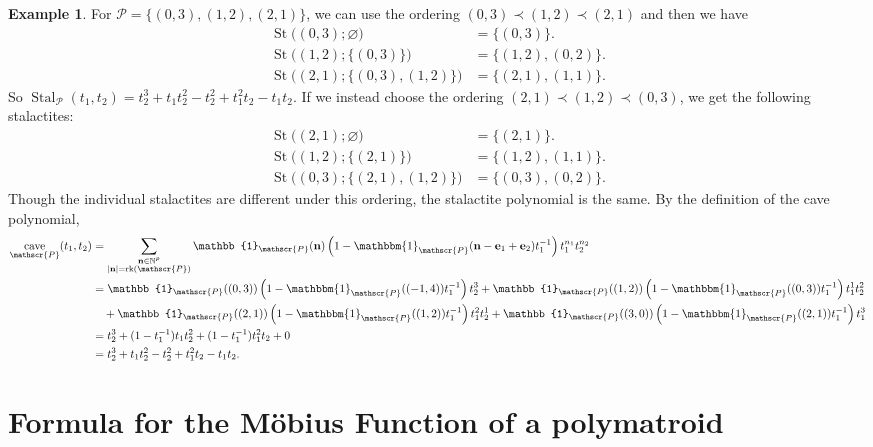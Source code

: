 \documentclass[a4paper, 11pt]{amsart}
\theoremstyle{definition}
\newtheorem{example}[example]{Example}
\newcommand{\bfn}{\mathbf{n}}
\newcommand{\bfe}{\mathbf{e}}
\newcommand{\sP}{\mathscr{P}}
\newcommand{\N}{\mathbb{N}}
\DeclareMathOperator{\rk}{rk}
\DeclareMathOperator{\St}{St}
\DeclareMathOperator{\cave}{cave}
\DeclareMathOperator{\Stal}{Stal}
\begin{document}
\begin{example}\label{ex:stal}
    For $\sP = \big\{(0,3), (1,2), (2,1)\big\}$, we can use the ordering $(0,3) \prec (1,2) \prec (2,1)$ and then we have 
    \begin{align*}
        \St\big((0,3);\varnothing\big) &= \{(0,3)\}.\\
        \St\big((1,2);\{(0,3)\}\big) &= \{(1,2), (0,2)\}.\\
        \St\big((2,1);\{(0,3), (1,2)\}\big) &= \{(2,1), (1,1)\}.
    \end{align*}
    So $\Stal_{\sP}(t_1,t_2) = t_2^3+t_1t_2^2-t_2^2+t_1^2t_2-t_1t_2$. 
    If we instead choose the ordering $(2,1) \prec (1,2) \prec (0,3)$, we get the following stalactites:
    \begin{align*}
        \St\big((2,1);\varnothing\big) &= \{(2,1)\}.\\
        \St\big((1,2);\{(2,1)\}\big) &= \{(1,2), (1,1)\}.\\
        \St\big((0,3);\{(2,1), (1,2)\}\big) &= \{(0,3), (0,2)\}.
    \end{align*}
Though the individual stalactites are different under this ordering, the stalactite polynomial is the same. By the definition of the cave polynomial, 
    \begin{align*}
        \cave_\sP(t_1,t_2) &= \sum_{\substack{\bfn \in \N^p \\ |\bfn| = \rk(\sP)}}\mathbb{1}_{\sP}(\bfn)\left(1-\mathbbm{1}_{\sP}(\bfn-\bfe_1+\bfe_2)t_1^{-1}\right)t_1^{n_1}t_2^{n_2}\\
        &= \mathbb{1}_{\sP}((0,3))\left(1-\mathbbm{1}_{\sP}((-1,4))t_1^{-1}\right)t_2^{3} + 
        \mathbb{1}_{\sP}((1,2))\left(1-\mathbbm{1}_{\sP}((0,3))t_1^{-1}\right)t_1^1t_2^2 \\
       & \quad  + \mathbb{1}_{\sP}((2,1))\left(1-\mathbbm{1}_{\sP}((1,2))t_1^{-1}\right)t_1^2t_2^1
        +\mathbb{1}_{\sP}((3,0))\left(1-\mathbbm{1}_{\sP}((2,1))t_1^{-1}\right)t_1^3\\
        &=t_2^3 + (1-t_1^{-1})t_1t_2^2 + (1-t_1^{-1})t_1^2t_2 +0\\
        &=t_2^3+t_1t_2^2-t_2^2+t_1^2t_2-t_1t_2.
    \end{align*}
\end{example}


\section{Formula for the M\"obius Function of a polymatroid}\label{mobius section}
\end{document}
